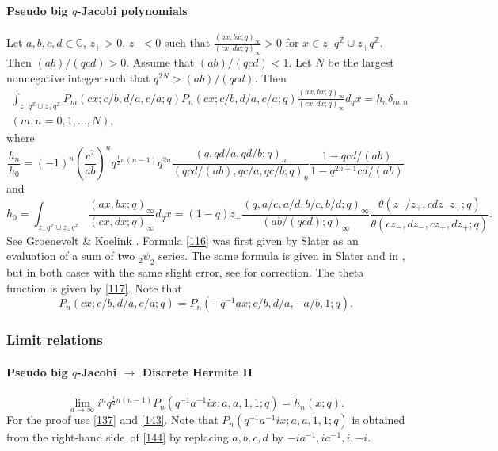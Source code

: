 \documentclass[twoside,11pt]{article}
\newcommand\CC{\mathbb{C}}
\newcommand\ZZ{\mathbb{Z}}
\newcommand\de\delta
\newcommand\tha\theta
\newcommand\half{\frac12}
\newcommand\iy\infty
\newcommand\wt{\widetilde}
\newcommand\RHS{right-hand side}
\begin{document}
\paragraph{Pseudo big $q$-Jacobi polynomials}
Let $a,b,c,d\in\CC$, $z_+>0$, $z_-<0$ such that
$\tfrac{(ax,bx;q)_\iy}{(cx,dx;q)_\iy}>0$ for $x\in z_- q^\ZZ\cup z_+ q^\ZZ$.
Then $(ab)/(qcd)>0$. Assume that $(ab)/(qcd)<1$.
Let $N$ be the largest nonnegative integer such that $q^{2N}>(ab)/(qcd)$.
Then
\begin{multline}
\int_{z_- q^\ZZ\cup z_+ q^\ZZ}P_m(cx;c/b,d/a,c/a;q) P_n(cx;c/b,d/a,c/a;q) 
\frac{(ax,bx;q)_\iy}{(cx,dx;q)_\iy} d_qx=h_n\de_{m,n}\\
(m,n=0,1,\ldots,N),
\label{114}
\end{multline}
where
\begin{equation}
\frac{h_n}{h_0}=(-1)^n\left(\frac{c^2}{ab}\right)^n q^{\half n(n-1)} q^{2n} 
\frac{(q,qd/a,qd/b;q)_n}{(qcd/(ab),qc/a,qc/b;q)_n} 
\frac{1-qcd/(ab)}{1-q^{2n+1}cd/(ab)}
\label{115}
\end{equation}
and
\begin{equation}
h_0=\int_{z_- q^\ZZ\cup z_+ q^\ZZ}\frac{(ax,bx;q)_\iy}{(cx,dx;q)_\iy} d_qx
=(1-q)z_+ 
\frac{(q,a/c,a/d,b/c,b/d;q)_\iy}{(ab/(qcd);q)_\iy} 
\frac{\tha(z_-/z_+,cdz_-z_+;q)}{\tha(cz_-,dz_-,cz_+,dz_+;q)} .
\label{116}
\end{equation}
See Groenevelt \& Koelink \cite[Prop.~2.2]{K14}.
Formula \eqref{116} was first given by Slater \cite[(5)]{K15} as an evaluation
of a sum of two ${}_2\psi_2$ series.
The same formula is given in Slater  and in
, but in both cases with the same slight error,
see \cite[2nd paragraph after Lemma 2.1]{K14} for correction.
The theta function is given by \eqref{117}.
Note that
\begin{equation}
P_n(cx;c/b,d/a,c/a;q)=P_n(-q^{-1}ax;c/b,d/a,-a/b,1;q).
\label{145}
\end{equation}
%
\subsubsection*{Limit relations}
\paragraph{Pseudo big $q$-Jacobi $\longrightarrow$ Discrete Hermite II}
\begin{equation}
\lim_{a\to\iy}i^n q^{\half n(n-1)} P_n(q^{-1}a^{-1}ix;a,a,1,1;q)=
\wt h_n(x;q).
\label{144}
\end{equation}
For the proof use \eqref{137} and \eqref{143}.
Note that $P_n(q^{-1}a^{-1}ix;a,a,1,1;q)$ is obtained from the
\RHS\ of \eqref{144} by replacing $a,b,c,d$ by $-ia^{-1},ia^{-1},i,-i$.
%
\end{document}
